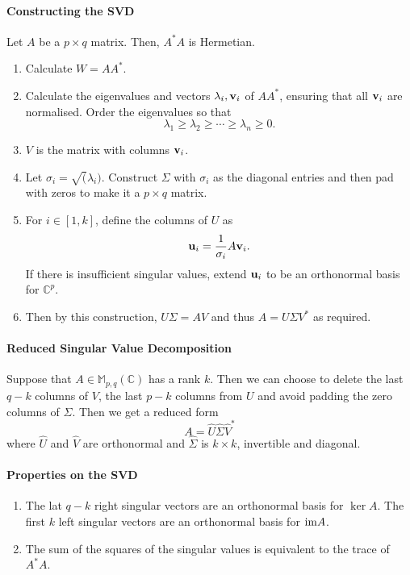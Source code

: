 \paragraph{Constructing the SVD}

Let \( A \) be a \( p \times q \) matrix.  Then, \( A^* A  \) is Hermetian.

\begin{enumerate}
    \item Calculate \( W = A A^* \).
    \item Calculate the eigenvalues and vectors \( \lambda_i, \mathbf{v}_i \)
        of \( A A^* \), ensuring that all \( \mathbf{v}_i \) are normalised.
        Order the eigenvalues so that \[
            \lambda_1 \geq \lambda_2 \geq\cdots \geq \lambda_n \geq 0
        .\]
    \item \( V \) is the matrix with columns \( \mathbf{v}_i \).
    \item Let \( \sigma_i = \sqrt(\lambda_i) \). Construct \( \Sigma \)
        with \( \sigma_i \) as the diagonal entries and then pad
        with zeros to make it a \( p \times q \) matrix.
    \item For \( i \in [1, k] \), define the columns of \( U \) as \[
        \mathbf{u}_i = \frac{1}{\sigma_i} A \mathbf{v}_i
    .\]
    If there is insufficient singular values, extend \( \mathbf{u}_i \)
    to be an orthonormal basis for \( \mathbb{C}^p \).
    \item Then by this construction, \( U \Sigma = A V \) and thus
        \( A = U \Sigma V^* \) as required.
\end{enumerate}

\paragraph{Reduced Singular Value Decomposition}
Suppose that \( A \in \mathbb{M}_{p, q} (\mathbb{C}) \)
has a rank \( k \). Then we can choose to delete the last
\( q - k \) columns of \( V \), the last \( p - k \) columns
from \( U \) and avoid padding the zero columns of \( \Sigma \).
Then we get a reduced form \[
    A = \hat{U} \hat{\Sigma} \hat{V}^*
\]
where \( \hat{U} \) and \( \hat{V} \) are orthonormal
and \( \hat{\Sigma} \) is \( k\times k \), invertible
and diagonal.

\paragraph{Properties on the SVD}
\begin{enumerate}
    \item The lat \( q - k \) right singular vectors
    are an orthonormal basis for \( \ker A \).
    The first \( k \) left singular vectors are an orthonormal
    basis for \( \mathrm{im} A \).
    \item The sum of the squares of the singular values is
    equivalent to the trace of \( A^* A \).
\end{enumerate}

